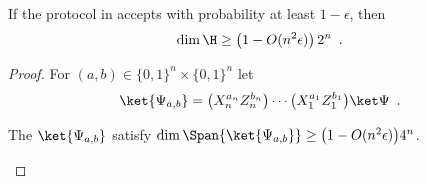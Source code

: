\documentclass[11pt]{article}
\begin{document}
\begin{corollary} \label{t:statedependentnqubitdimensionlowerbound}
If the protocol in  accepts with probability at least $1 - \epsilon$, then 
\begin{equation*}
\dim \H \geq \big( 1 - O(n^2 \epsilon) \big) \, 2^n
 \enspace .
\end{equation*}
\end{corollary}

\begin{proof}
For $(a, b) \in \{0,1\}^n \times \{0,1\}^n$ let 
\begin{equation*}
\ket{\Psi_{a,b}} 
= \big( X_n^{a_n} Z_n^{b_n} \big) \cdots \big( X_1^{a_1} Z_1^{b_1} \big) \ket \Psi
 \enspace .
\end{equation*}

\begin{claim}
The $\ket{\Psi_{a,b}}$ satisfy 
$\dim \Span \{ \ket{\Psi_{a,b}} \} \geq \big( 1 - O(n^2 \epsilon) \big) 4^n$.  
\end{claim}


\end{proof}
\end{document}
